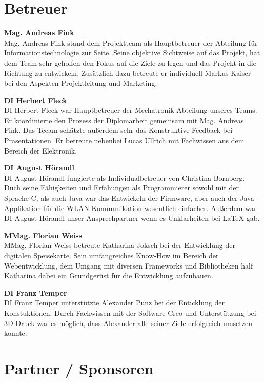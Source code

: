\section{Betreuer}
  \textbf{Mag. Andreas Fink}\\
  Mag. Andreas Fink stand dem Projektteam als Hauptbetreuer der Abteilung für Informationstechnologie zur Seite.
  Seine objektive Sichtweise auf das Projekt, hat dem Team sehr geholfen den Fokus auf die Ziele zu legen und
  das Projekt in die Richtung zu entwickeln.
  Zusätzlich dazu betreute er individuell Markus Kaiser bei den Aspekten Projektleitung und Marketing.

  \textbf{DI Herbert Fleck}\\
  DI Herbert Fleck war Hauptbetreuer der Mechatronik Abteilung unseres Teams. Er koordinierte den Prozess der Diplomarbeit
  gemeinsam mit Mag. Andreas Fink. Das Teeam schätzte außerdem sehr das Konstruktive Feedback bei Präsentationen.
  Er betreute nebenbei Lucas Ullrich mit Fachwissen aus dem Bereich der Elektronik.

  \textbf{DI August Hörandl}\\
  DI August Hörandl fungierte als Individualbetreuer von Christina Bornberg. Duch seine Fähigkeiten und
  Erfahungen als Programmierer sowohl mit der Sprache C, als auch Java war das Entwickeln der Firmware,
  aber auch der Java-Applikation für die WLAN-Kommunikation wesentlich einfacher. Außerdem war
  DI August Hörandl unser Ansprechpartner wenn es Unklarheiten bei LaTeX gab.

  \textbf{MMag. Florian Weiss}\\
  MMag. Florian Weiss betreute Katharina Joksch bei der Entwicklung der digitalen Speisekarte. Sein umfangreiches
  Know-How im Bereich der Webentwicklung, dem Umgang mit diversen Frameworks und Bibliotheken half Katharina
  dabei ein Grundgerüst für die Entwicklung aufzubauen.

  \textbf{DI Franz Temper}\\
  DI Franz Temper unterstützte Alexander Punz bei der Enticklung der Konstuktionen. Durch Fachwissen mit
  der Software Creo und Unterstützung bei 3D-Druck war es möglich, dass Alexander alle seiner Ziele erfolgreich
  umsetzen konnte.

\section{Partner / Sponsoren}

